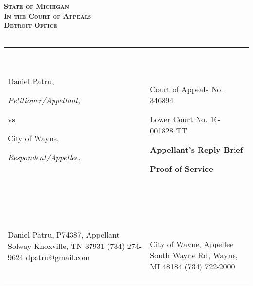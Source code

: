 \documentclass[12pt,\documentclassflag]{michiganCourtOfAppealsBrief}
\begin{document}
\begin{centering}
\bf\scshape State of Michigan\\In the Court of Appeals\\Detroit Office\\~\\ 
\rm 

\makeandtab
\setlength{\tabcolsep}{20pt}%
\begin{tabular}{p{} p{}}
\cline{1-2}
  {~

  \raggedright Daniel Patru,\par
  \hfill\textit{Petitioner/Appellant,}
  \vspace{.5\baselineskip}\par
  vs\par
  \vspace{.5\baselineskip}
  \raggedright City of Wayne,\par
  \hfill\textit{Respondent/Appellee.}
  
  ~} &  {~
       \par\par
       \hfill Court of Appeals No. 346894\par
       \hfill Lower Court No. 16-001828-TT\par\vspace{\baselineskip}
       \hfill \textbf{Appellant's Reply Brief}\par
       \hfill \textbf{Proof of Service}       
  ~}
  \\ \cline{1-2}\vspace{2mm}
  {~ \par
  Daniel Patru, P74387, Appellant\newline%
  3309 Solway\newline%
  Knoxville, TN 37931\newline%
  (734) 274-9624\newline%
  dpatru@gmail.com\newline\newline%
  ~} & {~ \par~\par
       
       City of Wayne, Appellee\newline%
       3355 South Wayne Rd,\newline%
       Wayne, MI 48184\newline%
       (734) 722-2000\newline\newline%

}
\end{tabular}
\end{centering}
\end{document}

